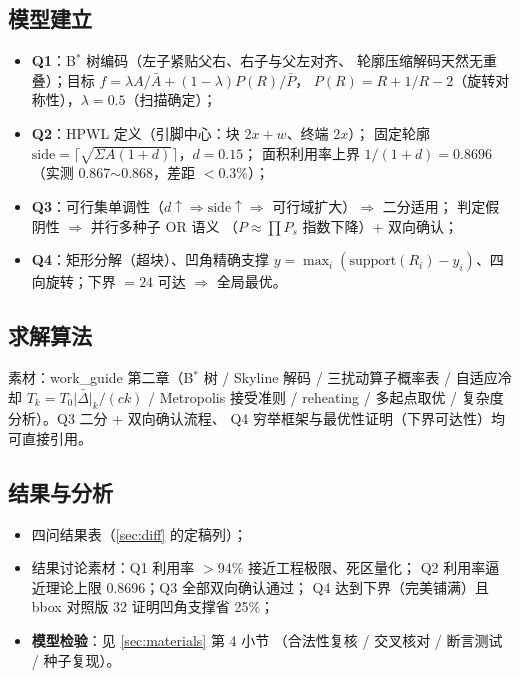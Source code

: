 \documentclass[12pt,a4paper]{article}
\begin{document}
\subsection{模型建立}

\begin{itemize}
    \item \textbf{Q1}：B$^*$ 树编码（左子紧贴父右、右子与父左对齐、
    轮廓压缩解码天然无重叠）；目标
    $f = \lambda A/\bar A + (1-\lambda)P(R)/\bar P$，
    $P(R)=R+1/R-2$（旋转对称性），$\lambda=0.5$（扫描确定）；
    \item \textbf{Q2}：HPWL 定义（引脚中心：块 $2x+w$、终端 $2x$）；
    固定轮廓 $\text{side}=\lceil\sqrt{\Sigma A(1+d)}\rceil$，$d=0.15$；
    面积利用率上界 $1/(1+d)=0.8696$（实测 0.867$\sim$0.868，差距 $<0.3\%$）；
    \item \textbf{Q3}：可行集单调性（$d\uparrow \Rightarrow \text{side}
    \uparrow \Rightarrow$ 可行域扩大）$\Rightarrow$ 二分适用；
    判定假阴性 $\Rightarrow$ 并行多种子 OR 语义
    （$P \approx \prod P_s$ 指数下降）+ 双向确认；
    \item \textbf{Q4}：矩形分解（超块）、凹角精确支撑
    $y=\max_i(\text{support}(R_i)-y_i)$、四向旋转；下界 $=24$ 可达
    $\Rightarrow$ 全局最优。
\end{itemize}

\subsection{求解算法}

素材：work\_guide 第二章（B$^*$ 树 / Skyline 解码 / 三扰动算子概率表 /
自适应冷却 $T_k = T_0\bar{|\Delta|}_k/(ck)$ / Metropolis 接受准则 /
reheating / 多起点取优 / 复杂度分析）。Q3 二分 + 双向确认流程、
Q4 穷举框架与最优性证明（下界可达性）均可直接引用。

\subsection{结果与分析}

\begin{itemize}
    \item 四问结果表（\ref{sec:diff} 的定稿列）；
    \item 结果讨论素材：Q1 利用率 $>94\%$ 接近工程极限、死区量化；
    Q2 利用率逼近理论上限 0.8696；Q3 全部双向确认通过；
    Q4 达到下界（完美铺满）且 bbox 对照版 32 证明凹角支撑省 25\%；
    \item \textbf{模型检验}：见 \ref{sec:materials} 第 4 小节
    （合法性复核 / 交叉核对 / 断言测试 / 种子复现）。
\end{itemize}
\end{document}
